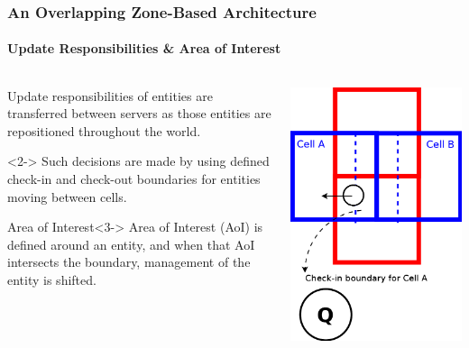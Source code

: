 \begin{frame}[fragile]
\frametitle{An Overlapping Zone-Based Architecture}
\framesubtitle{Update Responsibilities \& Area of Interest}
\begin{columns}

\begin{column}{0.65\textwidth}
Update responsibilities of entities are transferred between
servers as those entities are repositioned throughout the world.

\begin{block}{}<2->
Such decisions are made by using defined check-in and check-out boundaries for
entities moving between cells.
\end{block}

\begin{block}{Area of Interest}<3->
Area of Interest (AoI) is defined around an entity, and when that AoI
intersects the boundary, management of the entity is shifted.
\end{block}
\end{column}

\begin{column}{0.35\textwidth}
\begin{center}
\includegraphics[scale=.80]{aoi.png}
\end{center}
\end{column}

\end{columns}
\end{frame}

